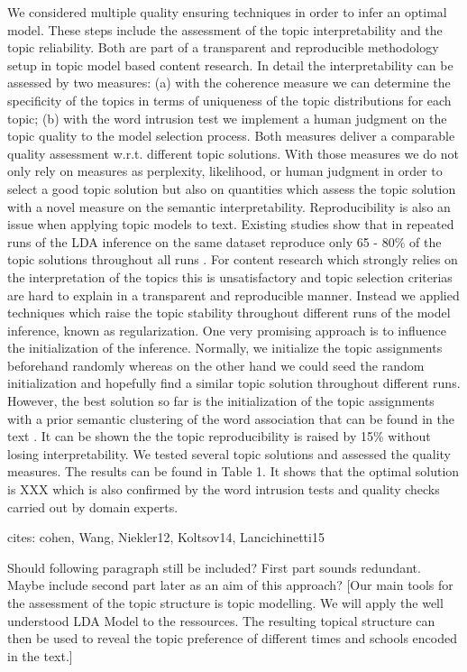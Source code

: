 \documentclass[a4paper,10pt]{article}
\newcommand{\TODO}[1]{\begingroup\color{red}#1\endgroup}
\newcommand{\NR}[1]{\begingroup\color{orange}#1\endgroup}
\begin{document}
We considered multiple quality ensuring techniques in
order to infer an optimal model. \NR{These} steps include the assessment of the
topic interpretability and the topic reliability. Both are part of a
transparent and reproducible methodology setup in topic model based content
research.  In detail the interpretability can be assessed by two
measures\NR{: (a) w}ith the coherence measure \cite{cohen} we can determine the
specificity of the topics in terms of uniqueness of the topic distributions
for each topic\NR{; (b) w}ith the word intrusion test \cite{Wang} we implement a human
judgment on the topic quality to the model selection process. Both measures
deliver a comparable quality assessment w.r.t. different topic
solutions. With those measures we do not only rely on measures as
perplexity, likelihood, or human judgment in order to select a good topic
solution but also on quantities which assess the topic solution with a novel
measure on the semantic interpretability. Reproducibility is also an issue
when applying topic models to text. Existing studies show that in repeated
runs of the LDA inference on the same dataset reproduce only 65 - 80\% of
the topic solutions throughout all runs \cite{Niekler12,Koltsov14}. For content
research which strongly relies on the interpretation of the topics this is
unsatisfactory and topic selection criterias are hard to explain in a
transparent and reproducible manner. Instead we applied techniques which
raise the topic stability throughout different runs of the model inference,
known as regularization. One  very promising approach is to influence the
initialization of the inference. Normally, we initialize the topic
assignments beforehand randomly \NR{whereas o}n the other hand we could seed the random
initialization and hopefully find a similar topic solution throughout
different runs. However, the best solution so far is the initialization of
the topic assignments with a prior semantic clustering of the word
association that can be found in the text \cite{Lancichinetti15}. It can be
shown the the topic reproducibility is raised by 15\% without losing
interpretability. We tested several topic solutions and assessed the
quality measures. The results can be found in \TODO{Table 1}. It shows that the
optimal solution is \TODO{XXX} which is also confirmed by the word intrusion tests
and quality checks carried out by domain experts.

\TODO{cites: cohen, Wang, Niekler12, Koltsov14, Lancichinetti15}



\TODO{Should following paragraph still be included?} \NR{First part sounds 
redundant. Maybe include second part later as an aim of this approach?}
  [Our main tools for the assessment of the topic structure is topic
  modelling.  We will apply the well understood LDA Model to
  the ressources. The resulting topical structure can then be used to
  reveal the topic preference of different times and \TODO{schools} encoded
  in the text.]
\end{document}
